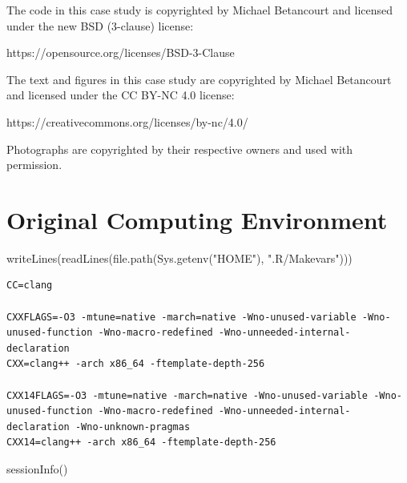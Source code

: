 \documentclass[
  letterpaper,
  DIV=11,
  numbers=noendperiod]{scrartcl}
\newenvironment{Shaded}{\begin{snugshade}}{\end{snugshade}}
\newcommand{\FunctionTok}[1]{\textcolor[rgb]{0.28,0.35,0.67}{#1}}
\newcommand{\NormalTok}[1]{\textcolor[rgb]{0.00,0.23,0.31}{#1}}
\newcommand{\StringTok}[1]{\textcolor[rgb]{0.13,0.47,0.30}{#1}}
\begin{document}
The code in this case study is copyrighted by Michael Betancourt and
licensed under the new BSD (3-clause) license:

https://opensource.org/licenses/BSD-3-Clause

The text and figures in this case study are copyrighted by Michael
Betancourt and licensed under the CC BY-NC 4.0 license:

https://creativecommons.org/licenses/by-nc/4.0/

Photographs are copyrighted by their respective owners and used with
permission.

\hypertarget{original-computing-environment}{%
\section*{Original Computing
Environment}\label{original-computing-environment}}

\begin{Shaded}
\begin{Highlighting}[]
\FunctionTok{writeLines}\NormalTok{(}\FunctionTok{readLines}\NormalTok{(}\FunctionTok{file.path}\NormalTok{(}\FunctionTok{Sys.getenv}\NormalTok{(}\StringTok{"HOME"}\NormalTok{), }\StringTok{".R/Makevars"}\NormalTok{)))}
\end{Highlighting}
\end{Shaded}

\begin{verbatim}
CC=clang

CXXFLAGS=-O3 -mtune=native -march=native -Wno-unused-variable -Wno-unused-function -Wno-macro-redefined -Wno-unneeded-internal-declaration
CXX=clang++ -arch x86_64 -ftemplate-depth-256

CXX14FLAGS=-O3 -mtune=native -march=native -Wno-unused-variable -Wno-unused-function -Wno-macro-redefined -Wno-unneeded-internal-declaration -Wno-unknown-pragmas
CXX14=clang++ -arch x86_64 -ftemplate-depth-256
\end{verbatim}

\begin{Shaded}
\begin{Highlighting}[]
\FunctionTok{sessionInfo}\NormalTok{()}
\end{Highlighting}
\end{Shaded}
\end{document}
